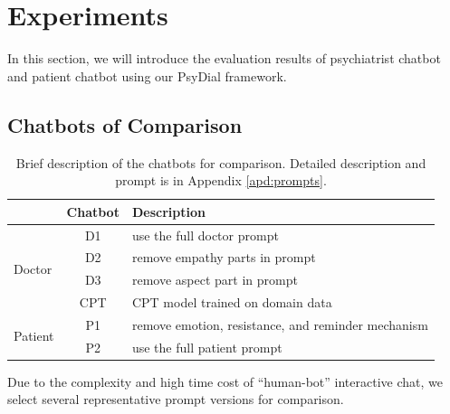 \section{Experiments}
In this section, we will introduce the evaluation results of psychiatrist chatbot and patient chatbot using our PsyDial framework. 

\subsection{Chatbots of Comparison}

\begin{table}[h]
    \centering
    \footnotesize
    \begin{tabular}{m{}|c|m{}}
    \hline
    & Chatbot & Description \\
    \hline
    \multirow{4}{0.1\columnwidth}{Doctor} & D1 & use the full doctor prompt \\
    \cline{2-3}
    & D2 & remove empathy parts in prompt  \\
    \cline{2-3}
    & D3 &  remove aspect part in prompt \\
    \cline{2-3}
    & CPT & CPT model trained on domain data \\
    \hline
    \multirow{2}{0.1\columnwidth}{Patient} & P1 & remove emotion, resistance, and reminder mechanism \\
    \cline{2-3}
    & P2 & use the full patient prompt\\
    \hline
    \end{tabular}
    \caption{Brief description of the chatbots for comparison. Detailed description and prompt is in Appendix \ref{apd:prompts}.}
    \label{tab:cmp_chatbots}
\end{table}

Due to the complexity and high time cost of ``human-bot'' interactive chat, we select several representative prompt versions for comparison.

